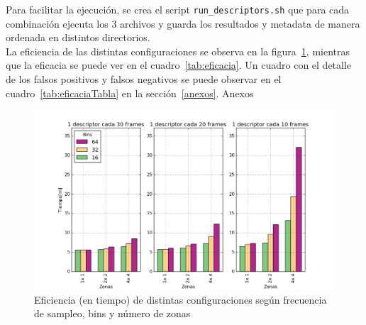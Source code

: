 \documentclass[14pt,letterpaper,hidelinks]{extarticle}
\begin{document}
Para facilitar la ejecución, se crea el script \verb+run_descriptors.sh+ que para cada combinación ejecuta los 3 archivos y guarda los resultados y metadata de manera ordenada en distintos directorios.\\

La eficiencia de las distintas configuraciones se observa en la figura~\ref{fig:experimentos}, mientras que la eficacia se puede ver en el cuadro~\ref{tab:eficacia}. Un cuadro con el detalle de los falsos positivos y falsos negativos se puede observar en el cuadro~\ref{tab:eficaciaTabla} en la sección~\ref{anexos}. Anexos

\begin{figure}[ht!]
\centering 
\captionsetup{justification=centering,margin=2cm}
\includegraphics[scale=0.6]{img/experimentos.png}
\caption{Eficiencia (en tiempo) de distintas configuraciones según frecuencia de sampleo, bins y número de zonas\label{fig:experimentos}}
\end{figure} 
\end{document}
